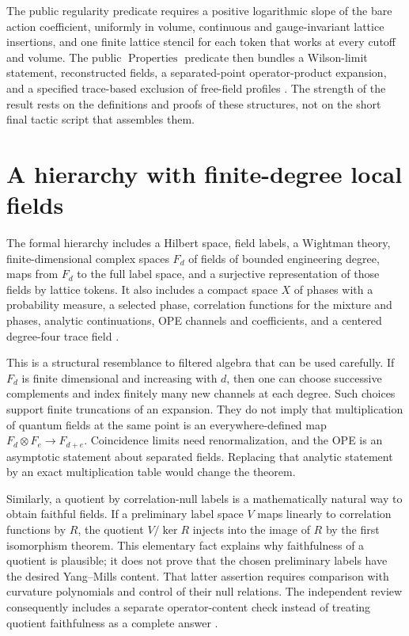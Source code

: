 The public regularity predicate requires a positive logarithmic slope of
the bare action coefficient, uniformly in volume, continuous and
gauge-invariant lattice insertions, and one finite lattice stencil for each
token that works at every cutoff and volume.  The public
$\operatorname{Properties}$ predicate then bundles a Wilson-limit
statement, reconstructed fields, a separated-point operator-product
expansion, and a specified trace-based exclusion of free-field profiles
\cite{OpenAIChallenge2026}.  The strength of the result rests on the
definitions and proofs of these structures, not on the short final tactic
script that assembles them.

\section{A hierarchy with finite-degree local fields}

The formal hierarchy includes a Hilbert space, field labels, a Wightman
theory, finite-dimensional complex spaces $F_d$ of fields of bounded
engineering degree, maps from $F_d$ to the full label space, and a
surjective representation of those fields by lattice tokens.  It also
includes a compact space $X$ of phases with a probability measure, a
selected phase, correlation functions for the mixture and phases,
analytic continuations, OPE channels and coefficients, and a centered
degree-four trace field \cite{OpenAIChallenge2026}.

This is a structural resemblance to filtered algebra that can be used
carefully.  If $F_d$ is finite dimensional and increasing with $d$, then
one can choose successive complements and index finitely many new channels
at each degree.  Such choices support finite truncations of an expansion.
They do not imply that multiplication of quantum fields at the same point
is an everywhere-defined map $F_d\otimes F_e\to F_{d+e}$.
Coincidence limits need renormalization, and the OPE is an asymptotic
statement about separated fields.  Replacing that analytic statement by
an exact multiplication table would change the theorem.

Similarly, a quotient by correlation-null labels is a mathematically
natural way to obtain faithful fields.  If a preliminary label space $V$
maps linearly to correlation functions by $R$, the quotient
$V/\ker R$ injects into the image of $R$ by the first isomorphism
theorem.  This elementary fact explains why faithfulness of a quotient is
plausible; it does not prove that the chosen preliminary labels have the
desired Yang--Mills content.  That latter assertion requires comparison
with curvature polynomials and control of their null relations.  The
independent review consequently includes a separate operator-content
check instead of treating quotient faithfulness as a complete answer
\cite{YMAcceptance2026}.

